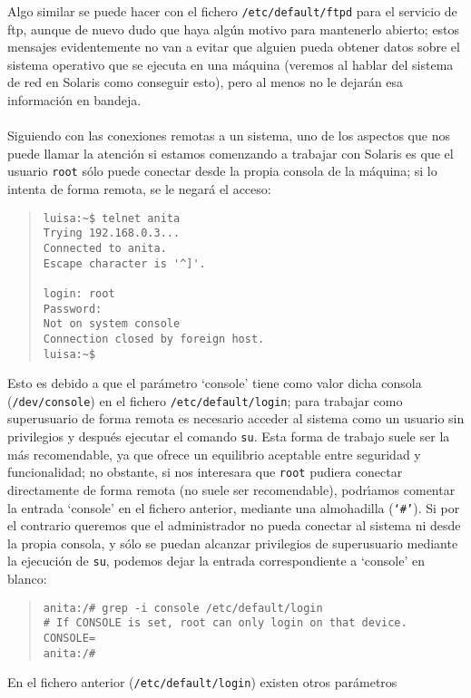 Algo similar se puede hacer con el fichero {\tt /etc/default/ftpd} para el
servicio de {\sc ftp}, aunque de nuevo dudo que haya alg\'un motivo para 
mantenerlo abierto; estos mensajes evidentemente no van a evitar que alguien
pueda obtener datos sobre el sistema operativo que se ejecuta en una m\'aquina 
(veremos al hablar del sistema de red en Solaris como conseguir esto), pero al 
menos no le dejar\'an esa informaci\'on en bandeja.\\
\\Siguiendo con las conexiones remotas a un sistema, uno de los aspectos que 
nos puede llamar la atenci\'on si estamos comenzando a trabajar con Solaris es 
que el usuario {\tt root} s\'olo puede conectar desde la propia consola de la
m\'aquina; si lo intenta de forma remota, se le negar\'a el acceso:
\begin{quote}
\begin{verbatim}
luisa:~$ telnet anita
Trying 192.168.0.3...
Connected to anita.
Escape character is '^]'.

login: root
Password: 
Not on system console
Connection closed by foreign host.
luisa:~$ 
\end{verbatim}
\end{quote}
Esto es debido a que el par\'ametro {\sc
`console'} tiene como valor dicha consola ({\tt /dev/console}) en el fichero 
{\tt /etc/default/login}; para trabajar como superusuario de forma remota es
necesario acceder al sistema como un usuario sin privilegios y despu\'es 
ejecutar el comando {\tt su}. Esta forma de trabajo suele ser la m\'as 
recomendable, ya que ofrece un equilibrio aceptable entre seguridad y 
funcionalidad; no obstante, si nos interesara que {\tt root} pudiera conectar 
directamente de forma remota (no suele ser recomendable), podr\'{\i}amos 
comentar la entrada {\sc `console'} en el fichero anterior, mediante una 
almohadilla ({\tt `\#'}). Si por el contrario queremos que el administrador no 
pueda conectar al sistema
ni desde la propia consola, y s\'olo se puedan alcanzar privilegios de 
superusuario mediante la ejecuci\'on de {\tt su}, podemos dejar la entrada
correspondiente a {\sc `console'} en blanco:
\begin{quote}
\begin{verbatim}
anita:/# grep -i console /etc/default/login
# If CONSOLE is set, root can only login on that device.
CONSOLE=
anita:/#
\end{verbatim}
\end{quote}
En el fichero anterior ({\tt /etc/default/login}) existen otros par\'ametros
